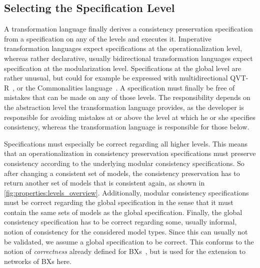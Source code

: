\subsection{Selecting the Specification Level}

A transformation language finally derives a consistency preservation specification from a specification on any of the levels and executes it. %
Imperative transformation languages expect specifications at the operationalization level, whereas rather declarative, usually bidirectional transformation languages expect specification at the modularization level.
Specifications at the global level are rather unusual, but could for example be expressed with multidirectional QVT-R~\cite{macedo2014FrameworkMultiDirectional-BX}, or the Commonalities language~\cite{gleitze2017a}.
A specification must finally be free of mistakes that can be made on any of those levels. 
The responsibility depends on the abstraction level the transformation language provides, as the developer is responsible for avoiding mistakes at or above the level at which he or she specifies consistency, whereas the transformation language is responsible for those below.

Specifications must especially be correct regarding all higher levels.
This means that an operationalization in consistency preservation specifications must preserve consistency according to the underlying modular consistency specifications.
So after changing a consistent set of models, the consistency preservation has to return another set of models that is consistent again, as shown in \autoref{fig:properties:levels_overview}.
Additionally, modular consistency specifications must be correct regarding the global specification in the sense that it must contain the same sets of models as the global specification. %
Finally, the global consistency specification has to be correct regarding some, usually informal, notion of consistency for the considered model types.
Since this can usually not be validated, we assume a global specification to be correct. %
This conforms to the notion of \emph{correctness} already defined for \acp{BX}~\cite{stevens2010sosym}, but is used for the extension to networks of \acp{BX} here.

